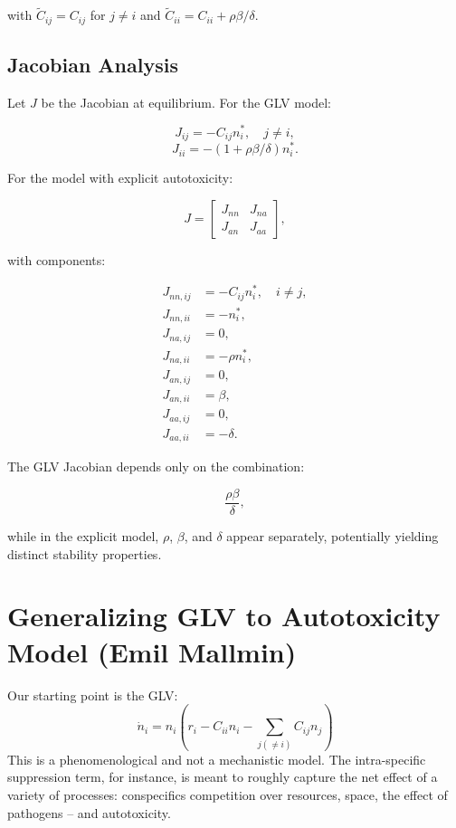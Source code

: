 \documentclass[11pt,a4paper,fleqn]{scrartcl}
\begin{document}
with $\tilde{C}_{ij} = C_{ij}$ for $j \ne i$ and $\tilde{C}_{ii} = C_{ii} + \rho \beta / \delta$.

\subsection*{Jacobian Analysis}

Let $J$ be the Jacobian at equilibrium. For the GLV model:

\begin{equation}
J_{ij} = -C_{ij} n_i^*, \quad j \ne i,
\end{equation}
\begin{equation}
J_{ii} = -(1 + \rho \beta / \delta) n_i^*.
\end{equation}

For the model with explicit autotoxicity:

\[
J = 
\begin{bmatrix}
J_{nn} & J_{na} \\
J_{an} & J_{aa}
\end{bmatrix},
\]

with components:

\begin{align}
J_{nn, ij} &= -C_{ij} n_i^*, \quad i \ne j, \\
J_{nn, ii} &= -n_i^*, \\
J_{na, ij} &= 0, \\
J_{na, ii} &= -\rho n_i^*, \\
J_{an, ij} &= 0, \\
J_{an, ii} &= \beta, \\
J_{aa, ij} &= 0, \\
J_{aa, ii} &= -\delta.
\end{align}

The GLV Jacobian depends only on the combination:

\begin{equation}
\frac{\rho \beta}{\delta},
\end{equation}

while in the explicit model, $\rho$, $\beta$, and $\delta$ appear separately, potentially yielding distinct stability properties.

\section{Generalizing GLV to Autotoxicity Model (Emil Mallmin)}


Our starting point is the GLV:
\begin{equation}
\dot{n}_i = n_i\left( r_i - C_{ii} n_i - \sum_{j(\neq i)} C_{ij} n_j \right)
\end{equation}
This is a phenomenological and not a mechanistic model. The intra-specific suppression term, for instance, is meant to roughly capture the net effect of a variety of processes: conspecifics competition over resources, space, the effect of pathogens -- and autotoxicity. 
\end{document}
